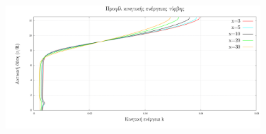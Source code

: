 \begin{figure}[h!]
    \begin{center}
        \includegraphics[width=0.85\textwidth]{figures/TE_B.pdf}
    \end{center}
\end{figure}
